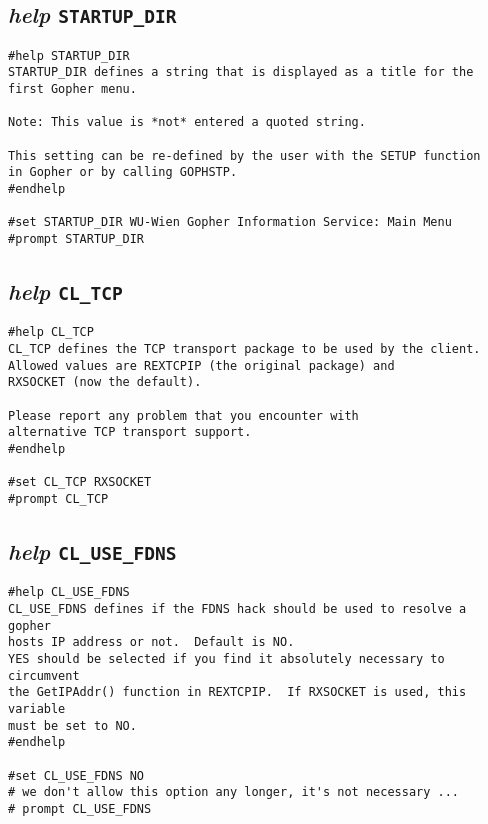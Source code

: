 \subsection{{\sl{help}} {\tt STARTUP\_DIR}}

\def\LPtopD{{\sl{help}} {\tt STARTUP\_DIR}}

\def\LPtopF{~}

\begin{verbatim}
#help STARTUP_DIR
STARTUP_DIR defines a string that is displayed as a title for the
first Gopher menu.

Note: This value is *not* entered a quoted string.

This setting can be re-defined by the user with the SETUP function
in Gopher or by calling GOPHSTP.
#endhelp

#set STARTUP_DIR WU-Wien Gopher Information Service: Main Menu
#prompt STARTUP_DIR
\end{verbatim}

\subsection{{\sl{help}} {\tt CL\_TCP}}

\def\LPtopD{{\sl{help}} {\tt CL\_TCP}}

\def\LPtopF{~}

\begin{verbatim}
#help CL_TCP
CL_TCP defines the TCP transport package to be used by the client.
Allowed values are REXTCPIP (the original package) and
RXSOCKET (now the default).

Please report any problem that you encounter with
alternative TCP transport support.
#endhelp

#set CL_TCP RXSOCKET
#prompt CL_TCP
\end{verbatim}

\subsection{{\sl{help}} {\tt CL\_USE\_FDNS}}

\def\LPtopD{{\sl{help}} {\tt CL\_USE\_FDNS}}

\def\LPtopF{~}

\begin{verbatim}
#help CL_USE_FDNS
CL_USE_FDNS defines if the FDNS hack should be used to resolve a gopher
hosts IP address or not.  Default is NO.
YES should be selected if you find it absolutely necessary to circumvent
the GetIPAddr() function in REXTCPIP.  If RXSOCKET is used, this variable
must be set to NO.
#endhelp

#set CL_USE_FDNS NO
# we don't allow this option any longer, it's not necessary ...
# prompt CL_USE_FDNS
\end{verbatim}


